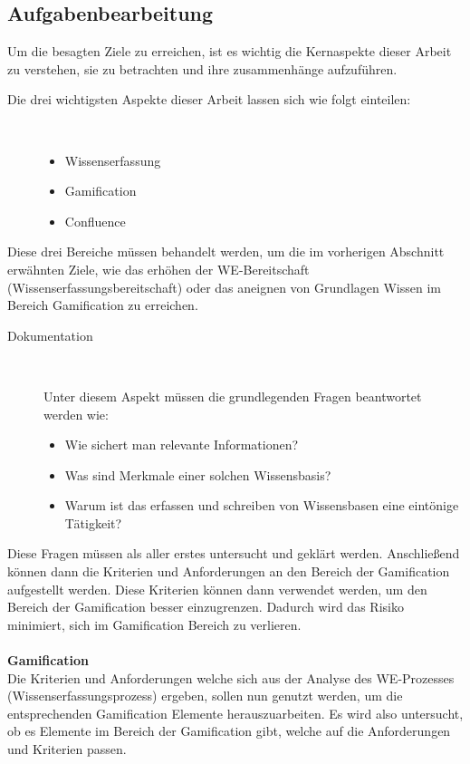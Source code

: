 \documentclass[a4paper,12pt]{scrartcl}
\begin{document}
\subsection{Aufgabenbearbeitung} 
Um die besagten Ziele zu erreichen, ist es wichtig die Kernaspekte dieser Arbeit zu verstehen, sie zu betrachten und ihre zusammenhänge aufzuführen.
\begin{description}
   \item[Die drei wichtigsten Aspekte dieser Arbeit lassen sich wie folgt einteilen:]~\par
   \begin{itemize}
      \item Wissenserfassung
      \item Gamification
      \item Confluence
   \end{itemize}
\end{description}
Diese drei Bereiche müssen behandelt werden, um die im vorherigen Abschnitt erwähnten Ziele, wie das erhöhen der WE-Bereitschaft (Wissenserfassungsbereitschaft) oder das aneignen von Grundlagen Wissen im Bereich Gamification zu erreichen.
\begin{description}
   \item[Dokumentation]~\par
Unter diesem Aspekt müssen die grundlegenden Fragen beantwortet werden wie:
   \begin{itemize}
      \item Wie sichert man relevante Informationen?
      \item Was sind Merkmale einer solchen Wissensbasis?
      \item Warum ist das erfassen und schreiben von Wissensbasen eine eintönige Tätigkeit?
   \end{itemize}
\end{description}
Diese Fragen müssen als aller erstes untersucht und geklärt werden. Anschließend können dann die Kriterien und Anforderungen an den Bereich der Gamification aufgestellt werden. Diese Kriterien können dann verwendet werden, um den Bereich der Gamification besser einzugrenzen. Dadurch wird das Risiko minimiert, sich im Gamification Bereich zu verlieren. 
\\\\
\textbf{Gamification}\\
Die Kriterien und Anforderungen welche sich aus der Analyse des WE-Prozesses (Wissenserfassungsprozess) ergeben, sollen nun genutzt werden, um die entsprechenden Gamification Elemente herauszuarbeiten. Es wird also untersucht, ob es Elemente im Bereich der Gamification gibt, welche auf die Anforderungen und Kriterien passen.
\end{document}
